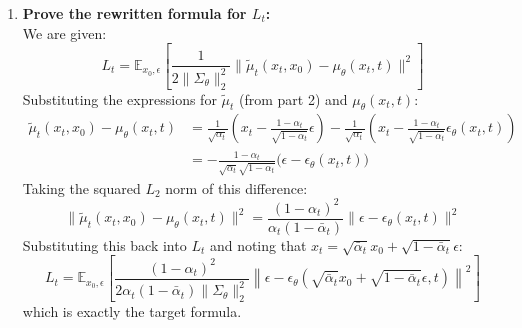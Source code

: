 \documentclass{article}
\begin{document}
{\begin{enumerate}
        \item \textbf{Prove the rewritten formula for $L_t$:} \\
        We are given:
        \begin{equation*}
            L_t = \mathbb{E}_{x_0, \epsilon} \left[ \frac{1}{2 \|\Sigma_\theta\|_2^2} \|\tilde{\mu}_t(x_t, x_0) - \mu_\theta(x_t, t)\|^2 \right]
        \end{equation*}
        Substituting the expressions for $\tilde{\mu}_t$ (from part 2) and $\mu_\theta(x_t, t)$:
        \begin{align*}
            \tilde{\mu}_t(x_t, x_0) - \mu_\theta(x_t, t) &= \frac{1}{\sqrt{\alpha_t}} \left( x_t - \frac{1 - \alpha_t}{\sqrt{1 - \bar{\alpha}_t}} \epsilon \right) - \frac{1}{\sqrt{\alpha_t}} \left( x_t - \frac{1 - \alpha_t}{\sqrt{1 - \bar{\alpha}_t}} \epsilon_\theta(x_t, t) \right) \\
            &= - \frac{1 - \alpha_t}{\sqrt{\alpha_t} \sqrt{1 - \bar{\alpha}_t}} \big( \epsilon - \epsilon_\theta(x_t, t) \big)
        \end{align*}
        Taking the squared $L_2$ norm of this difference:
        \begin{equation*}
            \|\tilde{\mu}_t(x_t, x_0) - \mu_\theta(x_t, t)\|^2 = \frac{(1 - \alpha_t)^2}{\alpha_t (1 - \bar{\alpha}_t)} \|\epsilon - \epsilon_\theta(x_t, t)\|^2
        \end{equation*}
        Substituting this back into $L_t$ and noting that $x_t = \sqrt{\bar{\alpha}_t} x_0 + \sqrt{1 - \bar{\alpha}_t} \epsilon$:
        \begin{equation*}
            L_t = \mathbb{E}_{x_0, \epsilon} \left[ \frac{(1 - \alpha_t)^2}{2 \alpha_t (1 - \bar{\alpha}_t) \|\Sigma_\theta\|_2^2} \left\| \epsilon - \epsilon_\theta(\sqrt{\bar{\alpha}_t} x_0 + \sqrt{1 - \bar{\alpha}_t} \epsilon, t) \right\|^2 \right]
        \end{equation*}
        which is exactly the target formula.
    \end{enumerate}
}
\end{document}
